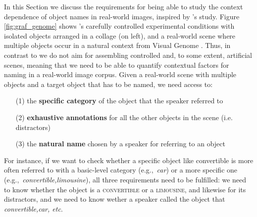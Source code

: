 \documentclass[runningheads]{llncs}
\newcommand{\refexp}[1]{\textsl{#1}}
\newcommand{\cat}[1]{\textsc{#1}}
\begin{document}
In this Section we discuss the requirements for  being able to study the context dependence of object names in real-world images, inspired by \cite{graf2016animal}'s study.
 Figure \ref{fig:graf_genome} shows  \cite{graf2016animal}'s carefully controlled experimental conditions with isolated objects arranged in a collage (on left), and a real-world scene where multiple objects occur in a natural context from Visual Genome \cite{krishna2016visualgenome}.
Thus, in contrast to \cite{graf2016animal} we do not aim for assembling controlled and, to some extent, artificial scenes, meaning that we need to be able to quantify contextual factors for naming in a real-world image corpus. 
Given a real-world scene with multiple objects and a target object that has to be named, we need access to:

\begin{itemize}   
		\item[(1)] the \textbf{specific category} of the object that the speaker referred to 
		\item[(2)] \textbf{exhaustive annotations} for all the other objects in the scene (i.e. distractors)
		\item[(3)] the \textbf{natural name} chosen by a speaker for referring to an object

\end{itemize}

For instance, if we want to check whether a specific object like convertible is more often referred to with a basic-level category (e.g.,~\refexp{car}) or a more specific one (e.g.,~\refexp{convertible,limousine}), all three requirements need to be fulfilled: we need to know whether the object is a \cat{convertible} or  a \cat{limousine}, and likewise for its distractors, and we need to know wether a speaker called the object that \refexp{convertible,car, etc}.
\end{document}
